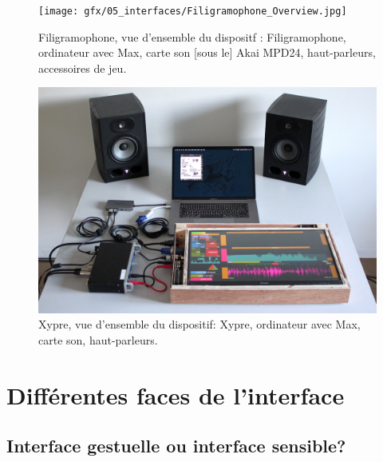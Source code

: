 \clearpage

\begin{figure}[!htbp]
	\captionsetup{format=plain}%
	\centering
	\begin{minipage}[t]{0.48\textwidth}
		\texttt{[image: gfx/05\_interfaces/Filigramophone\_Overview.jpg]}
		\caption[Filigramophone: vue d'ensemble]{Filigramophone, vue d'ensemble du dispositf : Filigramophone, ordinateur avec Max, carte son [sous le] Akai MPD24, haut-parleurs, accessoires de jeu.}
		\label{fig:interface:filigramophone_unplugged}
	\end{minipage}
	\hspace{.02\linewidth}
	\begin{minipage}[t]{0.48\textwidth}
	    \includegraphics[width=\linewidth]{gfx/05_interfaces/Xypre_Overview_144dpi.jpg}
		\caption[Xypre: vue d'ensemble]{Xypre, vue d'ensemble du dispositif: Xypre, ordinateur avec Max, carte son, haut-parleurs.}
		\label{fig:interface:xypre_unplugged}
	\end{minipage}
\end{figure}

\section{Différentes faces de l'interface}

\subsection{Interface gestuelle ou interface sensible?}


